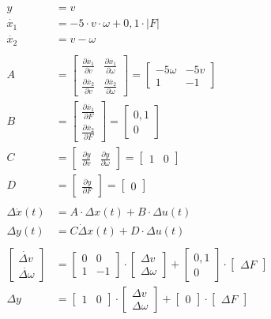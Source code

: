 \documentclass{article}
\newcommand\mat[1]{\begin{bmatrix}#1\end{bmatrix}}
\newcommand\pdiff[2]{\frac{\partial #1}{\partial #2}}
\begin{document}
\begin{enumerate}
\begin{enumerate}
\begin{enumerate}
                        \begin{align*}
                            y &= v\\
                            \dot{x_1} &= -5 \cdot v \cdot \omega + 0,1 \cdot |F|\\
                            \dot{x_2} &= v - \omega\\
                            \\
                            A &= \mat{\pdiff{\dot{x_1}}{v} & \pdiff{\dot{x_1}}{\omega}\\
                                      \pdiff{\dot{x_2}}{v} & \pdiff{\dot{x_2}}{\omega}} 
                               = \mat{-5 \omega & -5 v\\
                                      1 & -1}\\
                            B &= \mat{\pdiff{\dot{x_1}}{F}\\
                                      \pdiff{\dot{x_2}}{F}}
                               = \mat{0,1\\
                                      0}\\
                            C &= \mat{\pdiff{y}{v} & \pdiff{y}{\omega}}
                               = \mat{1 & 0}\\
                            D &= \mat{\pdiff{y}{F}}
                               = \mat{0}\\
                            \\
                            \Delta \dot x(t) &= A \cdot \Delta x(t) + B \cdot \Delta u(t)\\
                            \Delta y(t) &= C \dot \Delta x(t) + D \cdot \Delta u(t)\\
                            \\
                            \mat{\dot{\Delta v}\\ \dot{\Delta \omega}} &= \mat{0 & 0\\ 1 & -1} \cdot \mat{\Delta v\\ \Delta \omega} + \mat{0,1\\ 0} \cdot \mat{\Delta F}\\
                            \Delta y &= \mat{1 & 0} \cdot \mat{\Delta v\\ \Delta \omega} + \mat{0} \cdot \mat{\Delta F}\\
                        \end{align*}
    
                        
                \end{enumerate}
            

\end{enumerate}
\end{enumerate}
\end{document}
